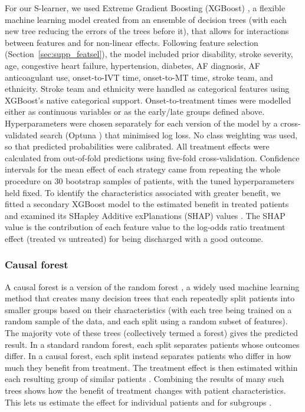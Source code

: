 For our S-learner, we used Extreme Gradient Boosting (XGBoost) , a flexible machine learning model created from an ensemble of decision trees (with each new tree reducing the errors of the trees before it), that allows for interactions between features and for non-linear effects. Following feature selection (Section~\ref{sec:supp_featsel}), the model included prior disability, stroke severity, age, congestive heart failure, hypertension, diabetes, AF diagnosis, AF anticoagulant use, onset-to-IVT time, onset-to-MT time, stroke team, and ethnicity. Stroke team and ethnicity were handled as categorical features using XGBoost's native categorical support. Onset-to-treatment times were modelled either as continuous variables or as the early/late groups defined above. Hyperparameters were chosen separately for each version of the model by a cross-validated search (Optuna ) that minimised log loss. No class weighting was used, so that predicted probabilities were calibrated. All treatment effects were calculated from out-of-fold predictions using five-fold cross-validation. Confidence intervals for the mean effect of each strategy came from repeating the whole procedure on 30 bootstrap samples of patients, with the tuned hyperparameters held fixed. To identify the characteristics associated with greater benefit, we fitted a secondary XGBoost model to the estimated benefit in treated patients and examined its SHapley Additive exPlanations (SHAP) values . The SHAP value is the contribution of each feature value to the log-odds ratio treatment effect (treated vs untreated) for being discharged with a good outcome.

\subsubsection{Causal forest}\label{sec:supp_cf_methods}

A causal forest is a version of the random forest , a widely used machine learning method that creates many decision trees that each repeatedly split patients into smaller groups based on their characteristics (with each tree being trained on a random sample of the data, and each split using a random subset of features). The majority vote of these trees (collectively termed a forest) gives the predicted result. In a standard random forest, each split separates patients whose outcomes differ. In a causal forest, each split instead separates patients who differ in how much they benefit from treatment. The treatment effect is then estimated within each resulting group of similar patients . Combining the results of many such trees shows how the benefit of treatment changes with patient characteristics. This lets us estimate the effect for individual patients and for subgroups .

